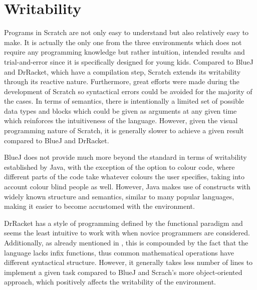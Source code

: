 \section{Writability}
\label{sec:writability}

Programs in Scratch are not only easy to understand but also relatively easy to make. It is actually the only one from the three environments which does not require any programming knowledge but rather intuition, intended results and trial-and-error since it is specifically designed for young kids. Compared to BlueJ and DrRacket, which have a compilation step, Scratch extends its writability through its reactive nature. Furthermore, great efforts were made during the development of Scratch so syntactical errors could be avoided for the majority of the cases. In terms of semantics, there is intentionally a limited set of possible data types and blocks which could be given as arguments at any given time which reinforces the intuitiveness of the language. However, given the visual programming nature of Scratch, it is generally slower to achieve a given result compared to BlueJ and DrRacket. 	 

BlueJ does not provide much more beyond the standard in terms of writability established by Java, with the exception of the option to colour code, where different parts of the code take whatever colours the user specifies, taking into account colour blind people as well. However, Java makes use of constructs with widely known structure and semantics, similar to many popular languages, making it easier to become accustomed with the environment.

DrRacket has a style of programming defined by the functional paradigm and seems the least intuitive to work with when novice programmers are considered. Additionally, as already mentioned in , this is compounded by the fact that the language lacks infix functions, thus common mathematical operations have different syntactical structure. However, it generally takes less number of lines to implement a given task compared to BlueJ and Scrach's more object-oriented approach, which positively affects the writability of the environment.